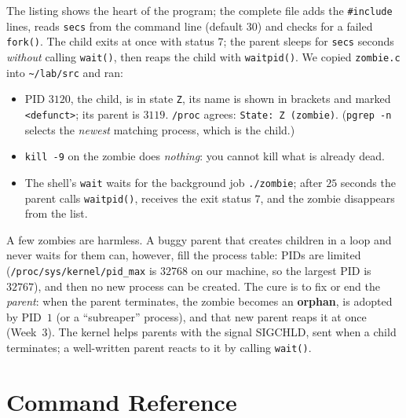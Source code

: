 \documentclass[11pt,a4paper]{article}
\newcommand{\term}[1]{\textbf{\color{mintdeep}#1}}
\newcommand{\cmd}[1]{\texttt{#1}}
\begin{document}


The listing shows the heart of the program; the complete file adds the \texttt{\#include} lines, reads \texttt{secs} from the command line (default $30$) and checks for a failed \cmd{fork()}. The child exits at once with status $7$; the parent sleeps for \texttt{secs} seconds \emph{without} calling \cmd{wait()}, then reaps the child with \cmd{waitpid()}. We copied \texttt{zombie.c} into \texttt{\textasciitilde/lab/src} and ran:



\begin{itemize}
  \item PID $3120$, the child, is in state \texttt{Z}, its name is shown in brackets and marked \texttt{<defunct>}; its parent is $3119$. \texttt{/proc} agrees: \texttt{State: Z (zombie)}. (\cmd{pgrep -n} selects the \emph{newest} matching process, which is the child.)
  \item \cmd{kill -9} on the zombie does \emph{nothing}: you cannot kill what is already dead.
  \item The shell's \cmd{wait} waits for the background job \texttt{./zombie}; after $25$ seconds the parent calls \cmd{waitpid()}, receives the exit status $7$, and the zombie disappears from the list.
\end{itemize}

A few zombies are harmless. A buggy parent that creates children in a loop and never waits for them can, however, fill the process table: PIDs are limited (\nolinkurl{/proc/sys/kernel/pid_max} is $32768$ on our machine, so the largest PID is $32767$), and then no new process can be created. The cure is to fix or end the \emph{parent}: when the parent terminates, the zombie becomes an \term{orphan}, is adopted by PID~$1$ (or a ``subreaper'' process), and that new parent reaps it at once (Week~3). The kernel helps parents with the signal SIGCHLD, sent when a child terminates; a well-written parent reacts to it by calling \cmd{wait()}.

\section{Command Reference}
\end{document}
